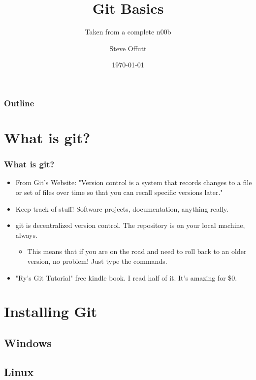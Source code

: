 \documentclass{beamer}
\title{Git Basics}
\subtitle{Taken from a complete n00b}
\author{Steve Offutt}
\institute{OSSEM}
\date{\today}
\begin{document}
\begin{frame}
    \titlepage
\end{frame}

\begin{frame}
    \frametitle{Outline}
    \tableofcontents
\end{frame} 

\section{What is git?}
\begin{frame}
    \frametitle{What is git?}
    \begin{itemize}
        \item{From Git's Website:}
            "Version control is a system that records changes to a file or set of files over time so that you can recall specific versions later."
        \item{Keep track of stuff! Software projects, documentation, anything really.}
        \item{git is decentralized version control. The repository is on your local machine, always.}
            \begin{itemize}
                \item{This means that if you are on the road and need to roll back to an older version, no problem! Just type the commands.}
            \end{itemize}
        \item{"Ry's Git Tutorial" free kindle book. I read half of it. It's amazing for \$0.}
    \end{itemize}
\end{frame} 

\section{Installing Git}
\subsection{Windows}
\subsection{Linux}
\end{document}
